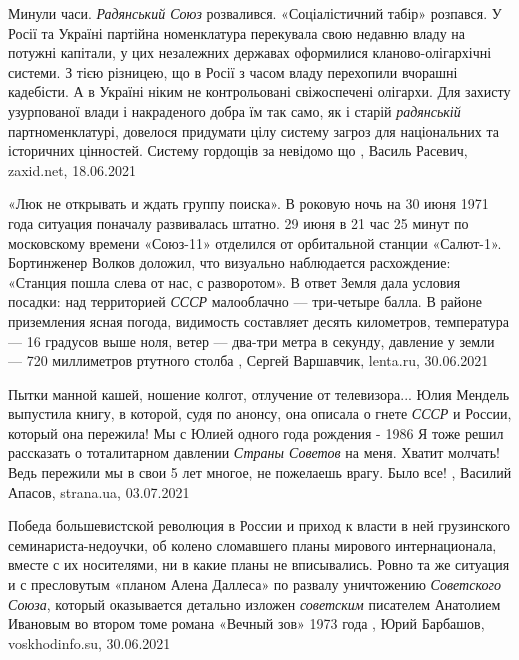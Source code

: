 Минули часи. \emph{Радянський Союз} розвалився. «Соціалістичний табір» розпався. У
Росії та Україні партійна номенклатура перекувала свою недавню владу на потужні
капітали, у цих незалежних державах оформилися кланово-олігархічні системи. З
тією різницею, що в Росії з часом владу перехопили вчорашні кадебісти. А в
Україні ніким не контрольовані свіжоспечені олігархи. Для захисту узурпованої
влади і накраденого добра їм так само, як і старій \emph{радянській} партноменклатурі,
довелося придумати цілу систему загроз для національних та історичних
цінностей. Систему гордощів за невідомо що
, 
Василь Расевич, zaxid.net, 18.06.2021


«Люк не открывать и ждать группу поиска».  В роковую ночь на 30 июня 1971 года
ситуация поначалу развивалась штатно. 29 июня в 21 час 25 минут по московскому
времени «Союз-11» отделился от орбитальной станции «Салют-1». Бортинженер
Волков доложил, что визуально наблюдается расхождение: «Станция пошла слева от
нас, с разворотом». В ответ Земля дала условия посадки: над территорией \emph{СССР}
малооблачно — три-четыре балла. В районе приземления ясная погода, видимость
составляет десять километров, температура — 16 градусов выше ноля, ветер —
два-три метра в секунду, давление у земли — 720 миллиметров ртутного столба
, Сергей Варшавчик, lenta.ru, 30.06.2021


Пытки манной кашей, ношение колгот, отлучение от телевизора...  Юлия Мендель
выпустила книгу, в которой, судя по анонсу, она описала о гнете \emph{СССР} и
России, который она пережила!  Мы с Юлией одного года рождения - 1986 Я тоже
решил рассказать о тоталитарном давлении \emph{Страны Советов} на меня. Хватит
молчать!  Ведь пережили мы в свои 5 лет многое, не пожелаешь врагу. Было все!
, 
Василий Апасов, strana.ua, 03.07.2021

Победа большевистской революция в России и приход к власти в ней грузинского
семинариста-недоучки, об колено сломавшего планы мирового интернационала,
вместе с их носителями, ни в какие планы не вписывались.  Ровно та же ситуация
и с пресловутым «планом Алена Даллеса» по развалу уничтожению \emph{Советского Союза},
который оказывается детально изложен \emph{советским} писателем Анатолием Ивановым во
втором томе романа «Вечный зов» 1973 года
, 
Юрий Барбашов, voskhodinfo.su, 30.06.2021

